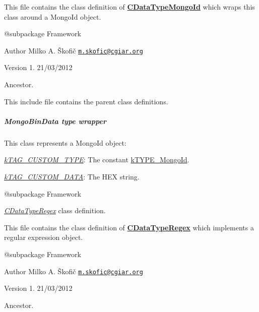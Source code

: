 This file contains the class definition of {\bfseries \hyperlink{class_c_data_type_mongo_id}{C\-Data\-Type\-Mongo\-Id}} which wraps this class around a Mongo\-Id object.

\begin{DoxyVerb} @subpackage        Framework
\end{DoxyVerb}


\begin{DoxyAuthor}{Author}
Milko A. Škofič \href{mailto:m.skofic@cgiar.org}{\tt m.\-skofic@cgiar.\-org} 
\end{DoxyAuthor}
\begin{DoxyVersion}{Version}
1. 21/03/2012
\end{DoxyVersion}
Ancestor.

This include file contains the parent class definitions. \subparagraph*{{\itshape Mongo\-Bin\-Data} type wrapper}

This class represents a Mongo\-Id object\-:


\begin{DoxyItemize}
\item {\itshape \hyperlink{}{k\-T\-A\-G\-\_\-\-C\-U\-S\-T\-O\-M\-\_\-\-T\-Y\-P\-E}}\-: The constant \hyperlink{}{k\-T\-Y\-P\-E\-\_\-\-Mongo\-Id}. 
\item {\itshape \hyperlink{}{k\-T\-A\-G\-\_\-\-C\-U\-S\-T\-O\-M\-\_\-\-D\-A\-T\-A}}\-: The H\-E\-X string. 
\end{DoxyItemize}

\begin{DoxyVerb} @subpackage        Framework\end{DoxyVerb}


{\itshape \hyperlink{class_c_data_type_regex}{C\-Data\-Type\-Regex}} class definition.

This file contains the class definition of {\bfseries \hyperlink{class_c_data_type_regex}{C\-Data\-Type\-Regex}} which implements a regular expression object.

\begin{DoxyVerb} @subpackage        Framework
\end{DoxyVerb}


\begin{DoxyAuthor}{Author}
Milko A. Škofič \href{mailto:m.skofic@cgiar.org}{\tt m.\-skofic@cgiar.\-org} 
\end{DoxyAuthor}
\begin{DoxyVersion}{Version}
1. 21/03/2012
\end{DoxyVersion}
Ancestor.

